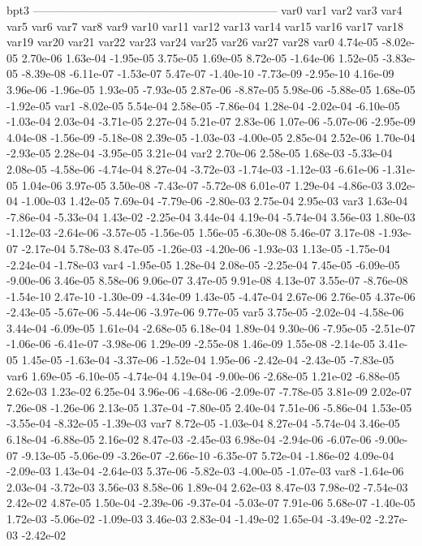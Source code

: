 bpt3
-----------------------------------------------------------------
var0 var1 var2 var3 var4 var5 var6 var7 var8 var9 var10 var11 var12 var13 var14 var15 var16 var17 var18 var19 var20 var21 var22 var23 var24 var25 var26 var27 var28 
var0  4.74e-05 -8.02e-05  2.70e-06  1.63e-04 -1.95e-05  3.75e-05  1.69e-05  8.72e-05 -1.64e-06  1.52e-05 -3.83e-05 -8.39e-08 -6.11e-07 -1.53e-07  5.47e-07 -1.40e-10 -7.73e-09 -2.95e-10  4.16e-09  3.96e-06 -1.96e-05  1.93e-05 -7.93e-05  2.87e-06 -8.87e-05  5.98e-06 -5.88e-05  1.68e-05 -1.92e-05
var1 -8.02e-05  5.54e-04  2.58e-05 -7.86e-04  1.28e-04 -2.02e-04 -6.10e-05 -1.03e-04  2.03e-04 -3.71e-05  2.27e-04  5.21e-07  2.83e-06  1.07e-06 -5.07e-06 -2.95e-09  4.04e-08 -1.56e-09 -5.18e-08  2.39e-05 -1.03e-03 -4.00e-05  2.85e-04  2.52e-06  1.70e-04 -2.93e-05  2.28e-04 -3.95e-05  3.21e-04
var2  2.70e-06  2.58e-05  1.68e-03 -5.33e-04  2.08e-05 -4.58e-06 -4.74e-04  8.27e-04 -3.72e-03 -1.74e-03 -1.12e-03 -6.61e-06 -1.31e-05  1.04e-06  3.97e-05  3.50e-08 -7.43e-07 -5.72e-08  6.01e-07  1.29e-04 -4.86e-03  3.02e-04 -1.00e-03  1.42e-05  7.69e-04 -7.79e-06 -2.80e-03  2.75e-04  2.95e-03
var3  1.63e-04 -7.86e-04 -5.33e-04  1.43e-02 -2.25e-04  3.44e-04  4.19e-04 -5.74e-04  3.56e-03  1.80e-03 -1.12e-03 -2.64e-06 -3.57e-05 -1.56e-05  1.56e-05 -6.30e-08  5.46e-07  3.17e-08 -1.93e-07 -2.17e-04  5.78e-03  8.47e-05 -1.26e-03 -4.20e-06 -1.93e-03  1.13e-05 -1.75e-04 -2.24e-04 -1.78e-03
var4 -1.95e-05  1.28e-04  2.08e-05 -2.25e-04  7.45e-05 -6.09e-05 -9.00e-06  3.46e-05  8.58e-06  9.06e-07  3.47e-05  9.91e-08  4.13e-07  3.55e-07 -8.76e-08 -1.54e-10  2.47e-10 -1.30e-09 -4.34e-09  1.43e-05 -4.47e-04  2.67e-06  2.76e-05  4.37e-06 -2.43e-05 -5.67e-06 -5.44e-06 -3.97e-06  9.77e-05
var5  3.75e-05 -2.02e-04 -4.58e-06  3.44e-04 -6.09e-05  1.61e-04 -2.68e-05  6.18e-04  1.89e-04  9.30e-06 -7.95e-05 -2.51e-07 -1.06e-06 -6.41e-07 -3.98e-06  1.29e-09 -2.55e-08  1.46e-09  1.55e-08 -2.14e-05  3.41e-05  1.45e-05 -1.63e-04 -3.37e-06 -1.52e-04  1.95e-06 -2.42e-04 -2.43e-05 -7.83e-05
var6  1.69e-05 -6.10e-05 -4.74e-04  4.19e-04 -9.00e-06 -2.68e-05  1.21e-02 -6.88e-05  2.62e-03  1.23e-02  6.25e-04  3.96e-06 -4.68e-06 -2.09e-07 -7.78e-05  3.81e-09  2.02e-07  7.26e-08 -1.26e-06  2.13e-05  1.37e-04 -7.80e-05  2.40e-04  7.51e-06 -5.86e-04  1.53e-05 -3.55e-04 -8.32e-05 -1.39e-03
var7  8.72e-05 -1.03e-04  8.27e-04 -5.74e-04  3.46e-05  6.18e-04 -6.88e-05  2.16e-02  8.47e-03 -2.45e-03  6.98e-04 -2.94e-06 -6.07e-06 -9.00e-07 -9.13e-05 -5.06e-09 -3.26e-07 -2.66e-10 -6.35e-07  5.72e-04 -1.86e-02  4.09e-04 -2.09e-03  1.43e-04 -2.64e-03  5.37e-06 -5.82e-03 -4.00e-05 -1.07e-03
var8 -1.64e-06  2.03e-04 -3.72e-03  3.56e-03  8.58e-06  1.89e-04  2.62e-03  8.47e-03  7.98e-02 -7.54e-03  2.42e-02  4.87e-05  1.50e-04 -2.39e-06 -9.37e-04 -5.03e-07  7.91e-06  5.68e-07 -1.40e-05  1.72e-03 -5.06e-02 -1.09e-03  3.46e-03  2.83e-04 -1.49e-02  1.65e-04 -3.49e-02 -2.27e-03 -2.42e-02
